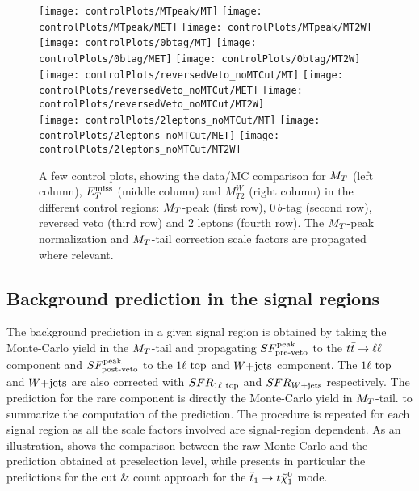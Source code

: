         \begin{figure}[h!]
            \centering
            \texttt{[image: controlPlots/MTpeak/MT]}
            \texttt{[image: controlPlots/MTpeak/MET]}
            \texttt{[image: controlPlots/MTpeak/MT2W]}\\
            \texttt{[image: controlPlots/0btag/MT]}
            \texttt{[image: controlPlots/0btag/MET]}
            \texttt{[image: controlPlots/0btag/MT2W]}\\
            \texttt{[image: controlPlots/reversedVeto\_noMTCut/MT]}
            \texttt{[image: controlPlots/reversedVeto\_noMTCut/MET]}
            \texttt{[image: controlPlots/reversedVeto\_noMTCut/MT2W]}\\
            \texttt{[image: controlPlots/2leptons\_noMTCut/MT]}
            \texttt{[image: controlPlots/2leptons\_noMTCut/MET]}
            \texttt{[image: controlPlots/2leptons\_noMTCut/MT2W]}\\
            \caption{A few control plots, showing the data/MC comparison for
            $M_T$ (left column), $E_T^\text{miss}$ (middle column) and $M_{T2}^W$ (right
            column) in the different control regions: $M_T$-peak (first row),
            $0\, b\text{-tag}$ (second row), reversed veto (third row) and 2
            leptons (fourth row). The $M_T$-peak normalization and $M_T$-tail
            correction scale factors are propagated where relevant.}
            \label{fig:preselControlPlots}
        \end{figure}

    \subsection{Background prediction in the signal regions}

    The background prediction in a given signal region is obtained by taking the
    Monte-Carlo yield in the $M_T$-tail and propagating $SF_{\text{pre-veto}}^{\text{peak}}$ to the
    $t\bar{t} \rightarrow \ell \ell$ component and $SF_{\text{post-veto}}^{\text{peak}}$ to the $1\ell~\text{top}$ and $\text{$W$+jets}$
    component. The $1\ell~\text{top}$ and $\text{$W$+jets}$ are also corrected with
    $SFR_{1\ell~\text{top}}$ and $SFR_{\text{$W$+jets}}$ respectively. The prediction for the rare
    component is directly the Monte-Carlo yield in $M_T$-tail.
     to 
    summarize the computation of the prediction. The procedure is repeated for
    each signal region as all the scale factors involved are signal-region
    dependent. As an illustration,  shows the
    comparison between the raw Monte-Carlo and the prediction obtained at
    preselection level, while  presents in
    particular the predictions for the cut \& count approach for the $\tilde{t}_1
    \rightarrow t \tilde{\chi}_1^0$ mode.

